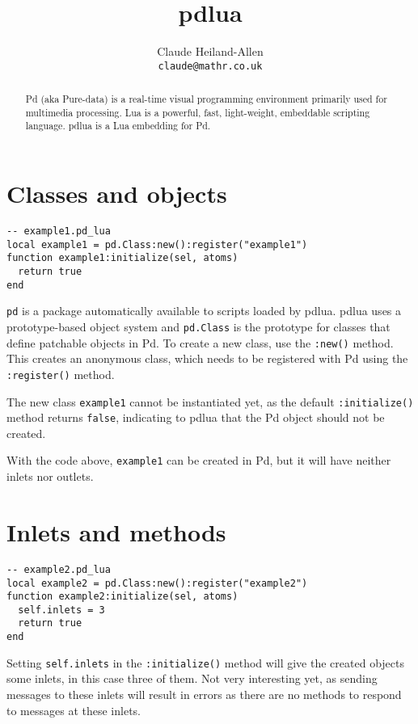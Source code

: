 \documentclass{article}
\title{pdlua}
\author{Claude Heiland-Allen
\\
\tt{claude@mathr.co.uk}}
\begin{document}
\maketitle

\begin{abstract}
Pd (aka Pure-data) is a real-time visual programming environment
primarily used for multimedia processing. Lua is a powerful, fast,
light-weight, embeddable scripting language. pdlua is a Lua embedding
for Pd.
\end{abstract}

\section{Classes and objects}

\begin{verbatim}
-- example1.pd_lua
local example1 = pd.Class:new():register("example1")
function example1:initialize(sel, atoms)
  return true
end
\end{verbatim}

{\tt pd} is a package automatically available to scripts loaded by pdlua.
pdlua uses a prototype-based object system and {\tt pd.Class} is the
prototype for classes that define patchable objects in Pd.  To create a
new class, use the {\tt :new()} method.  This creates an anonymous class,
which needs to be registered with Pd using the {\tt :register()} method.

The new class {\tt example1} cannot be instantiated yet, as the default
{\tt :initialize()} method returns {\tt false}, indicating to pdlua that
the Pd object should not be created.

With the code above, {\tt example1} can be created in Pd, but it will
have neither inlets nor outlets.

\section{Inlets and methods}

\begin{verbatim}
-- example2.pd_lua
local example2 = pd.Class:new():register("example2")
function example2:initialize(sel, atoms)
  self.inlets = 3
  return true
end
\end{verbatim}

Setting {\tt self.inlets} in the {\tt :initialize()} method will give
the created objects some inlets, in this case three of them.  Not very
interesting yet, as sending messages to these inlets will result in
errors as there are no methods to respond to messages at these inlets.
\end{document}
